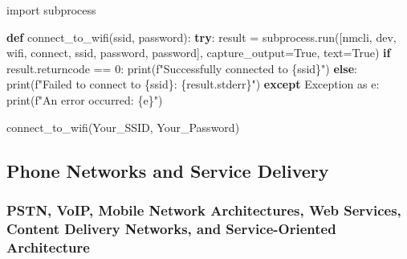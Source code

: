 \documentclass[
  letterpaper,
  DIV=11,
  numbers=noendperiod]{scrreprt}
\newenvironment{Shaded}{\begin{snugshade}}{\end{snugshade}}
\newcommand{\BuiltInTok}[1]{\textcolor[rgb]{0.00,0.23,0.31}{#1}}
\newcommand{\ControlFlowTok}[1]{\textcolor[rgb]{0.00,0.23,0.31}{\textbf{#1}}}
\newcommand{\DecValTok}[1]{\textcolor[rgb]{0.68,0.00,0.00}{#1}}
\newcommand{\ImportTok}[1]{\textcolor[rgb]{0.00,0.46,0.62}{#1}}
\newcommand{\KeywordTok}[1]{\textcolor[rgb]{0.00,0.23,0.31}{\textbf{#1}}}
\newcommand{\NormalTok}[1]{\textcolor[rgb]{0.00,0.23,0.31}{#1}}
\newcommand{\OperatorTok}[1]{\textcolor[rgb]{0.37,0.37,0.37}{#1}}
\newcommand{\PreprocessorTok}[1]{\textcolor[rgb]{0.68,0.00,0.00}{#1}}
\newcommand{\SpecialCharTok}[1]{\textcolor[rgb]{0.37,0.37,0.37}{#1}}
\newcommand{\SpecialStringTok}[1]{\textcolor[rgb]{0.13,0.47,0.30}{#1}}
\newcommand{\StringTok}[1]{\textcolor[rgb]{0.13,0.47,0.30}{#1}}
\newcommand{\VariableTok}[1]{\textcolor[rgb]{0.07,0.07,0.07}{#1}}
\begin{document}
\begin{Shaded}
\begin{Highlighting}[]
\ImportTok{import}\NormalTok{ subprocess}

\KeywordTok{def}\NormalTok{ connect\_to\_wifi(ssid, password):}
    \ControlFlowTok{try}\NormalTok{:}
\NormalTok{        result }\OperatorTok{=}\NormalTok{ subprocess.run([}\StringTok{\textquotesingle{}nmcli\textquotesingle{}}\NormalTok{, }\StringTok{\textquotesingle{}dev\textquotesingle{}}\NormalTok{, }\StringTok{\textquotesingle{}wifi\textquotesingle{}}\NormalTok{, }\StringTok{\textquotesingle{}connect\textquotesingle{}}\NormalTok{, ssid, }\StringTok{\textquotesingle{}password\textquotesingle{}}\NormalTok{, password], capture\_output}\OperatorTok{=}\VariableTok{True}\NormalTok{, text}\OperatorTok{=}\VariableTok{True}\NormalTok{)}
        \ControlFlowTok{if}\NormalTok{ result.returncode }\OperatorTok{==} \DecValTok{0}\NormalTok{:}
            \BuiltInTok{print}\NormalTok{(}\SpecialStringTok{f"Successfully connected to }\SpecialCharTok{\{}\NormalTok{ssid}\SpecialCharTok{\}}\SpecialStringTok{"}\NormalTok{)}
        \ControlFlowTok{else}\NormalTok{:}
            \BuiltInTok{print}\NormalTok{(}\SpecialStringTok{f"Failed to connect to }\SpecialCharTok{\{}\NormalTok{ssid}\SpecialCharTok{\}}\SpecialStringTok{: }\SpecialCharTok{\{}\NormalTok{result}\SpecialCharTok{.}\NormalTok{stderr}\SpecialCharTok{\}}\SpecialStringTok{"}\NormalTok{)}
    \ControlFlowTok{except} \PreprocessorTok{Exception} \ImportTok{as}\NormalTok{ e:}
        \BuiltInTok{print}\NormalTok{(}\SpecialStringTok{f"An error occurred: }\SpecialCharTok{\{}\NormalTok{e}\SpecialCharTok{\}}\SpecialStringTok{"}\NormalTok{)}

\NormalTok{connect\_to\_wifi(}\StringTok{\textquotesingle{}Your\_SSID\textquotesingle{}}\NormalTok{, }\StringTok{\textquotesingle{}Your\_Password\textquotesingle{}}\NormalTok{)}
\end{Highlighting}
\end{Shaded}

\subsection{Phone Networks and Service
Delivery}\label{phone-networks-and-service-delivery}

\subsubsection{PSTN, VoIP, Mobile Network Architectures, Web Services,
Content Delivery Networks, and Service-Oriented
Architecture}\label{pstn-voip-mobile-network-architectures-web-services-content-delivery-networks-and-service-oriented-architecture}
\end{document}
